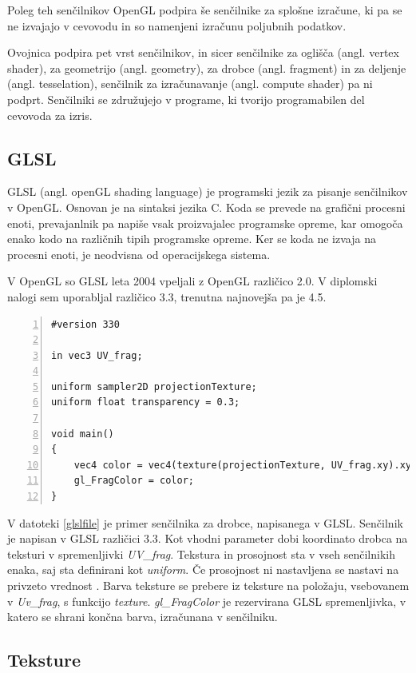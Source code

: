 \documentclass[a4paper, 12pt]{book}
\begin{document}
Poleg teh senčilnikov OpenGL podpira še senčilnike za splošne izračune, ki pa se ne izvajajo v cevovodu in so namenjeni izračunu poljubnih podatkov.

Ovojnica podpira pet vrst senčilnikov, in sicer senčilnike za oglišča (angl. vertex shader), za geometrijo (angl. geometry), za drobce (angl. fragment) in za deljenje (angl. tesselation), senčilnik za izračunavanje (angl. compute shader) pa ni podprt. Senčilniki se združujejo v programe, ki tvorijo programabilen del cevovoda za izris.

\subsection{GLSL}

GLSL (angl. openGL shading language) je programski jezik za pisanje sen\-čil\-nik\-ov v OpenGL. Osnovan je na sintaksi jezika C. Koda se prevede na grafični procesni enoti, prevajanlnik pa napiše vsak proizvajalec programske opreme, kar omogoča enako kodo na različnih tipih programske opreme. Ker se koda ne izvaja na procesni enoti, je neodvisna od operacijskega sistema.

V OpenGL so GLSL leta 2004 vpeljali z OpenGL različico 2.0. V diplomski nalogi sem uporabljal različico 3.3, trenutna najnovejša pa je 4.5. 
{\footnotesize
\begin{lstlisting}[captionpos=b, frame=single, caption={Primer preprostega senčilnika za drobce.}, breaklines=true, firstline=1, numbers=left, label={glslfile}]
#version 330

in vec3 UV_frag; 

uniform sampler2D projectionTexture;
uniform float transparency = 0.3;

void main()
{
	vec4 color = vec4(texture(projectionTexture, UV_frag.xy).xyz, transparency);
	gl_FragColor = color;
}	
\end{lstlisting}
}
V datoteki \ref{glslfile} je primer senčilnika za drobce, napisanega v GLSL. Senčilnik je napisan v GLSL različici 3.3. Kot vhodni parameter dobi koordinato drobca na teksturi v spremenljivki \emph{UV\_frag}. Tekstura in prosojnost sta v vseh senčilnikih enaka, saj sta definirani kot \emph{uniform}. Če prosojnost ni nastavljena se nastavi na privzeto vrednost . Barva teksture se prebere iz teksture na položaju, vsebovanem v \emph{Uv\_frag}, s funkcijo \emph{texture}. \emph{gl\_FragColor} je rezervirana GLSL spremenljivka, v katero se shrani končna barva, izračunana v senčilniku.
\subsection*{Teksture}
\end{document}
